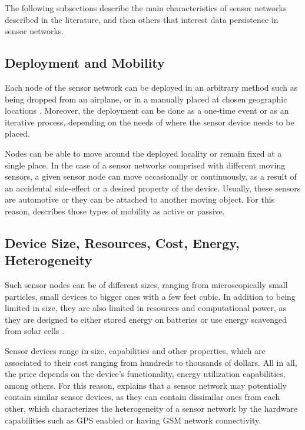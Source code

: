 The following subsections describe the main characteristics of sensor networks
described in the literature, and then others that interest data persistence in
sensor networks.

\subsection{Deployment and Mobility}

Each node of the sensor network can be deployed in an arbitrary method such as
being dropped from an airplane, or in a manually placed at chosen geographic
locations \cite{sn-intro01}. Moreover, the deployment can be done as a one-time
event or as an iterative process, depending on the needs of where the sensor
device needs to be placed.

Nodes can be able to move around the deployed locality or remain fixed at a
single place. In the case of a sensor networks comprised with different moving
sensors, a given sensor node can move occasionally or continuously, as a result
of an accidental side-effect or a desired property of the device. Usually,
these sensors are automotive or they can be attached to another moving object.
For this reason, \cite{sn-intro01} describes those types of mobility as active
or passive.

\subsection{Device Size, Resources, Cost, Energy, Heterogeneity}

Such sensor nodes can be of different sizes, ranging from microscopically small
particles, small devices to bigger ones with a few feet cubic. In addition to
being limited in size, they are also limited in resources and computational
power, as they are designed to either stored energy on batteries or
use energy scavenged from solar cells \cite{sn-intro01}.

Sensor devices range in size, capabilities and other properties, which are
associated to their cost ranging from hundreds to thousands of dollars. All in
all, the price depends on the device's functionality, energy utilization
capabilities, among others. For this reason, \cite{sn-intro01} explains that a
sensor network may potentially contain similar sensor devices, as they can
contain dissimilar ones from each other, which characterizes the heterogeneity
of a sensor network by the hardware capabilities such as GPS enabled or having
GSM network connectivity.

